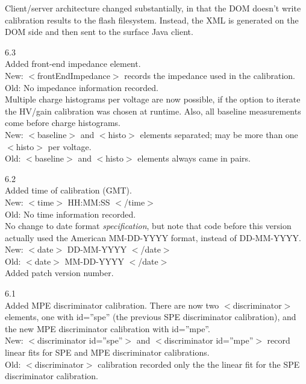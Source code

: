 \documentclass[10pt]{article}
\begin{document}
  Client/server architecture changed substantially, in that the DOM doesn't
  write calibration results to the flash filesystem.  Instead, the XML is
  generated on the DOM side and then sent to the surface Java client.  

\item{6.3}\\
  Added front-end impedance element.\\
  New: $<$frontEndImpedance$>$ records the impedance used in the
  calibration.\\
  Old: No impedance information recorded.\\

  Multiple charge histograms per voltage are now possible, if the option 
  to iterate the HV/gain calibration was chosen at runtime.  Also, all
  baseline measurements come before charge histograms.\\
  New: $<$baseline$>$ and $<$histo$>$ elements separated; may be more than
  one $<$histo$>$ per voltage.\\
  Old: $<$baseline$>$ and $<$histo$>$ elements always came in pairs.\\

\item{6.2}\\
  Added time of calibration (GMT).\\
  New: $<$time$>$ HH:MM:SS $<$/time$>$\\
  Old: No time information recorded.\\

  No change to date format \textit{specification}, but note that code
  before this version actually used the American MM-DD-YYYY format, instead
  of DD-MM-YYYY.\\
  New: $<$date$>$ DD-MM-YYYY $<$/date$>$\\
  Old: $<$date$>$ MM-DD-YYYY $<$/date$>$\\

  Added patch version number.\\

\item{6.1}\\ 
  Added MPE discriminator calibration.  There are now two
  $<$discriminator$>$ elements, one with id=''spe'' (the previous SPE
  discriminator calibration), and the new MPE discriminator calibration
  with id=''mpe''.\\
  New: $<$discriminator id=''spe''$>$ and $<$discriminator id=''mpe''$>$
  record linear fits for SPE and MPE discriminator calibrations.\\
  Old: $<$discriminator$>$ calibration recorded only the the linear fit for
  the SPE discriminator calibration.\\
\end{document}
